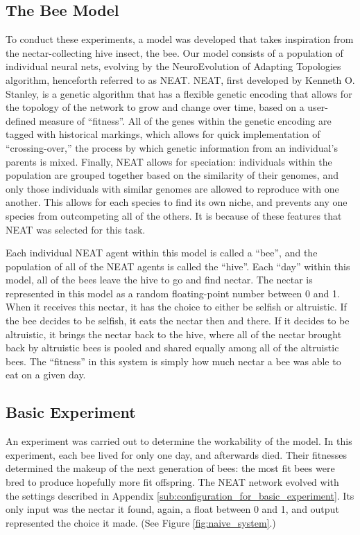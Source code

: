 \documentclass[twoside]{article}
\begin{document}
\begin{multicols}{2}
		\subsection{The Bee Model} %
		\label{sub:the_bee_model}
			To conduct these experiments, a model was developed that takes inspiration from the nectar-collecting hive insect, the bee. Our model consists of a population of individual neural nets, evolving by the NeuroEvolution of Adapting Topologies algorithm, henceforth referred to as NEAT.\cite{neat} NEAT, first developed by Kenneth O. Stanley, is a genetic algorithm that has a flexible genetic encoding that allows for the topology of the network to grow and change over time, based on a user-defined measure of ``fitness''. All of the genes within the genetic encoding are tagged with historical markings, which allows for quick implementation of ``crossing-over,'' the process by which genetic information from an individual's parents is mixed. Finally, NEAT allows for speciation: individuals within the population are grouped together based on the similarity of their genomes, and only those individuals with similar genomes are allowed to reproduce with one another. This allows for each species to find its own niche, and prevents any one species from outcompeting all of the others. It is because of these features that NEAT was selected for this task.

			Each individual NEAT agent within this model is called a ``bee'', and the population of all of the NEAT agents is called the ``hive''. Each ``day'' within this model, all of the bees leave the hive to go and find nectar. The nectar is represented in this model as a random floating-point number between 0 and 1. When it receives this nectar, it has the choice to either be selfish or altruistic. If the bee decides to be selfish, it eats the nectar then and there. If it decides to be altruistic, it brings the nectar back to the hive, where all of the nectar brought back by altruistic bees is pooled and shared equally among all of the altruistic bees. The ``fitness'' in this system is simply how much nectar a bee was able to eat on a given day.

		\subsection{Basic Experiment} %
		\label{sub:basic_experiment}
			An experiment was carried out to determine the workability of the model. In this experiment, each bee lived for only one day, and afterwards died. Their fitnesses determined the makeup of the next generation of bees: the most fit bees were bred to produce hopefully more fit offspring. The NEAT network evolved with the settings described in Appendix \ref{sub:configuration_for_basic_experiment}. Its only input was the nectar it found, again, a float between 0 and 1, and output represented the choice it made. (See Figure \ref{fig:naive_system}.)


\end{multicols}
\end{document}

